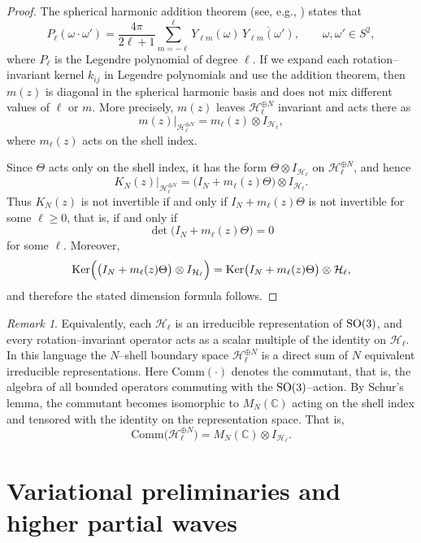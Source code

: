 \documentclass[a4paper,11pt]{article}
\numberwithin{equation}{section}
\renewcommand{\ker}{\text{\rm Ker}}
\theoremstyle{definition}
\theoremstyle{remark}
\newtheorem{rem}{Remark}
\begin{document}
\begin{proof}
The spherical harmonic addition theorem (see, e.g., \cite{AbramowitzStegun})
states that
$$
 P_\ell(\omega\cdot\omega')
 =
 \frac{4\pi}{2\ell+1}
 \sum_{m=-\ell}^{\ell}
 Y_{\ell m}(\omega)\,\overline{Y_{\ell m}(\omega')},
 \qquad \omega,\omega'\in S^2,
$$
where $P_\ell$ is the Legendre polynomial of degree $\ell$.
If we expand each rotation--invariant kernel $k_{ij}$ in Legendre polynomials
and use the addition theorem, then $m(z)$ is diagonal in the spherical harmonic
basis and does not mix different values of $\ell$ or $m$.
More precisely, $m(z)$ leaves $\mathcal H_\ell^{\oplus N}$ invariant and acts
there as
$$
 m(z)\big|_{\mathcal H_\ell^{\oplus N}}
 =
 m_\ell(z)\otimes I_{\mathcal H_\ell},
$$
where $m_\ell(z)$ acts on the shell index.

Since $\Theta$ acts only on the shell index, it has the form
$\Theta\otimes I_{\mathcal H_\ell}$ on $\mathcal H_\ell^{\oplus N}$, and hence
$$
 K_N(z)\big|_{\mathcal H_\ell^{\oplus N}}
 =
 \bigl(I_N+m_\ell(z)\Theta\bigr)\otimes I_{\mathcal H_\ell}.
$$
Thus $K_N(z)$ is not invertible if and only if $I_N+m_\ell(z)\Theta$ is not
invertible for some $\ell\ge0$, that is, if and only if
$$
 \det\bigl(I_N+m_\ell(z)\Theta\bigr)=0
$$
for some $\ell$.
Moreover,
$$
 \ker\Bigl(\bigl(I_N+m_\ell(z)\Theta\bigr)\otimes I_{\mathcal H_\ell}\Bigr)
 =
 \ker\bigl(I_N+m_\ell(z)\Theta\bigr)\otimes \mathcal H_\ell,
$$
and therefore the stated dimension formula follows.
\end{proof}

\begin{rem}
Equivalently, each $\mathcal H_\ell$ is an irreducible representation of
${\rm SO}(3)$, and every rotation--invariant operator acts as a scalar multiple
of the identity on $\mathcal H_\ell$.
In this language the $N$--shell boundary space $\mathcal H_\ell^{\oplus N}$ is a
direct sum of $N$ equivalent irreducible representations.
Here $\mathrm{Comm}(\cdot)$ denotes the commutant, that is, the algebra of all
bounded operators commuting with the ${\rm SO}(3)$--action.
By Schur's lemma, the commutant becomes isomorphic to $M_N(\mathbb C)$ acting on
the shell index and tensored with the identity on the representation space.
That is,
\[
\mathrm{Comm}\bigl(\mathcal H_\ell^{\oplus N}\bigr)
=
M_N(\mathbb C)\otimes I_{\mathcal H_\ell}.
\]
\end{rem}


\section{Variational preliminaries and higher partial waves}\label{sec:var}
\end{document}
